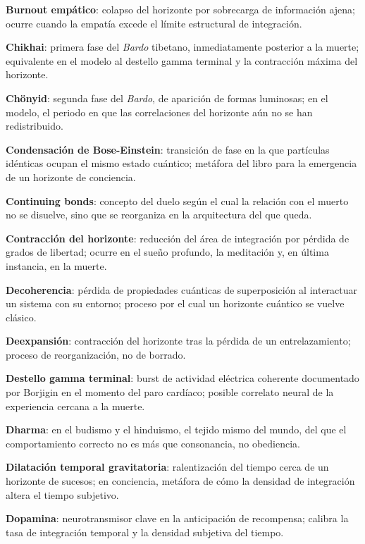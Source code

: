 \glos \textbf{Burnout empático}: colapso del horizonte por sobrecarga de información ajena; ocurre cuando la empatía excede el límite estructural de integración.

\glos \textbf{Chikhai}: primera fase del \emph{Bardo} tibetano, inmediatamente posterior a la muerte; equivalente en el modelo al destello gamma terminal y la contracción máxima del horizonte.

\glos \textbf{Chönyid}: segunda fase del \emph{Bardo}, de aparición de formas luminosas; en el modelo, el periodo en que las correlaciones del horizonte aún no se han redistribuido.

\glos \textbf{Condensación de Bose-Einstein}: transición de fase en la que partículas idénticas ocupan el mismo estado cuántico; metáfora del libro para la emergencia de un horizonte de conciencia.

\glos \textbf{Continuing bonds}: concepto del duelo según el cual la relación con el muerto no se disuelve, sino que se reorganiza en la arquitectura del que queda.

\glos \textbf{Contracción del horizonte}: reducción del área de integración por pérdida de grados de libertad; ocurre en el sueño profundo, la meditación y, en última instancia, en la muerte.

\glos \textbf{Decoherencia}: pérdida de propiedades cuánticas de superposición al interactuar un sistema con su entorno; proceso por el cual un horizonte cuántico se vuelve clásico.

\glos \textbf{Deexpansión}: contracción del horizonte tras la pérdida de un entrelazamiento; proceso de reorganización, no de borrado.

\glos \textbf{Destello gamma terminal}: burst de actividad eléctrica coherente documentado por Borjigin en el momento del paro cardíaco; posible correlato neural de la experiencia cercana a la muerte.

\glos \textbf{Dharma}: en el budismo y el hinduismo, el tejido mismo del mundo, del que el comportamiento correcto no es más que consonancia, no obediencia.

\glos \textbf{Dilatación temporal gravitatoria}: ralentización del tiempo cerca de un horizonte de sucesos; en conciencia, metáfora de cómo la densidad de integración altera el tiempo subjetivo.

\glos \textbf{Dopamina}: neurotransmisor clave en la anticipación de recompensa; calibra la tasa de integración temporal y la densidad subjetiva del tiempo.

